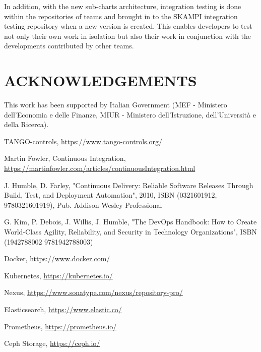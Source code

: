 \documentclass[a4paper,
               keeplastbox,   %
               ]{jacow}
\begin{document}
In addition, with the new sub-charts architecture, integration testing is done within the repositories of teams and brought in to the SKAMPI integration testing repository when a new version is created.  This enables developers to test not only their own work in isolation but also their work in conjunction with the developments contributed by other teams.

\section{ACKNOWLEDGEMENTS}
This work has been supported by Italian Government (MEF - Ministero dell'Economia e delle Finanze, MIUR - Ministero dell'Istruzione, dell'Università e della Ricerca).

%
	{\printbibliography}%
	{%
	
	\begin{thebibliography}{99} %
	
		TANGO-controls,
		\url{https://www.tango-controls.org/}
	
		Martin Fowler, Continuous Integration,
		\url{https://martinfowler.com/articles/continuousIntegration.html}
		
	    J. Humble, D. Farley, "Continuous Delivery: Reliable Software Releases Through Build, Test, and Deployment Automation",
	    2010, ISBN (0321601912, 9780321601919), Pub. Addison-Wesley Professional
	
	    G. Kim, P. Debois, J. Willis, J. Humble, "The DevOps Handbook: How to Create World-Class Agility, Reliability, and Security in Technology Organizations", ISBN (1942788002 9781942788003)
	    
		Docker, 
		\url{https://www.docker.com/}

		Kubernetes,
		\url{https://kubernetes.io/}

		Nexus,
		\url{https://www.sonatype.com/nexus/repository-pro/}

		Elasticsearch,
		\url{https://www.elastic.co/}

		Prometheus,
		\url{https://prometheus.io/}

		Ceph Storage,
		\url{https://ceph.io/}


\end{thebibliography}}
\end{document}
